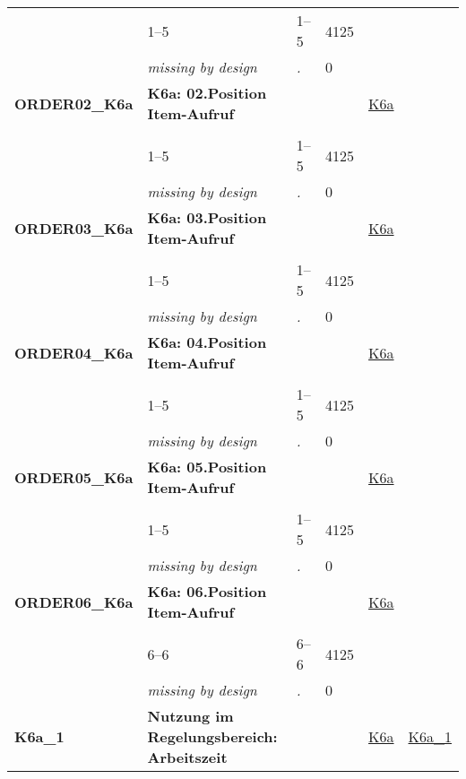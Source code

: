 \begin{longtable}{| L{2.45cm} | L{6cm} | C{1.5cm} | R{1cm} | C{2.25cm} | C{2.25cm} |}
   & 1--5 & 1--5 & 4125 &  &  \\ 
   & \textit{missing by design} & \textit{.} & 0 &  &  \\ 
   \midrule
\textbf{ORDER02\_K6a}\label{var:ORDER02:K6a} & \textbf{K6a: 02.Position Item-Aufruf} &  &  & \hyperref[K6a]{K6a} & \hyperref[var:suf:]{} \\ 
   &  &  &  &  &  \\ 
   & 1--5 & 1--5 & 4125 &  &  \\ 
   & \textit{missing by design} & \textit{.} & 0 &  &  \\ 
   \midrule
\textbf{ORDER03\_K6a}\label{var:ORDER03:K6a} & \textbf{K6a: 03.Position Item-Aufruf} &  &  & \hyperref[K6a]{K6a} & \hyperref[var:suf:]{} \\ 
   &  &  &  &  &  \\ 
   & 1--5 & 1--5 & 4125 &  &  \\ 
   & \textit{missing by design} & \textit{.} & 0 &  &  \\ 
   \midrule
\textbf{ORDER04\_K6a}\label{var:ORDER04:K6a} & \textbf{K6a: 04.Position Item-Aufruf} &  &  & \hyperref[K6a]{K6a} & \hyperref[var:suf:]{} \\ 
   &  &  &  &  &  \\ 
   & 1--5 & 1--5 & 4125 &  &  \\ 
   & \textit{missing by design} & \textit{.} & 0 &  &  \\ 
   \midrule
\textbf{ORDER05\_K6a}\label{var:ORDER05:K6a} & \textbf{K6a: 05.Position Item-Aufruf} &  &  & \hyperref[K6a]{K6a} & \hyperref[var:suf:]{} \\ 
   &  &  &  &  &  \\ 
   & 1--5 & 1--5 & 4125 &  &  \\ 
   & \textit{missing by design} & \textit{.} & 0 &  &  \\ 
   \midrule
\textbf{ORDER06\_K6a}\label{var:ORDER06:K6a} & \textbf{K6a: 06.Position Item-Aufruf} &  &  & \hyperref[K6a]{K6a} & \hyperref[var:suf:]{} \\ 
   &  &  &  &  &  \\ 
   & 6--6 & 6--6 & 4125 &  &  \\ 
   & \textit{missing by design} & \textit{.} & 0 &  &  \\ 
   \midrule
\textbf{K6a\_1}\label{var:K6a:1} & \textbf{Nutzung im Regelungsbereich: Arbeitszeit} &  &  & \hyperref[K6a]{K6a} & \hyperref[var:suf:K6a:1]{K6a\_1} \\ 

\end{longtable}
